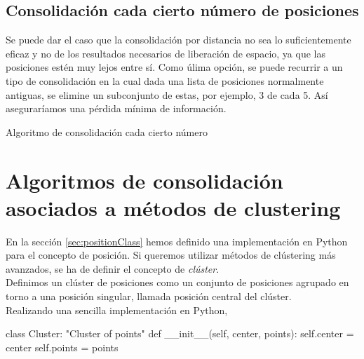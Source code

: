 \documentclass[a4paper, 12pt]{article}
\begin{document}
\subsection{Consolidaci\'on cada cierto n\'umero de posiciones}

Se puede dar el caso que la consolidaci\'on por distancia no sea lo suficientemente eficaz y no de los resultados necesarios de liberaci\'on de espacio, ya que las posiciones est\'en muy lejos entre s\'i. Como \'ulima opci\'on, se puede recurrir a un tipo de consolidaci\'on en la cual dada una lista de posiciones normalmente antiguas, se elimine un subconjunto de estas, por ejemplo, 3 de cada 5. As\'i asegurar\'iamos una p\'erdida m\'inima de informaci\'on. \\

\begin{algorithm}[h]\label{consolidationByEachSomeNumber}
\begin{algorithmic}[1]
			\EndFor
		\EndIf
	\EndFor
\EndFunction
\end{algorithmic}
\caption{\label{alg:consolidationByEach} Algoritmo de consolidaci\'on cada cierto n\'umero}
\end{algorithm}


\pagebreak
\section{Algoritmos de consolidaci\'on asociados a m\'etodos de clustering}



En la secci\'on \ref{sec:positionClass} hemos definido una implementaci\'on en Python para el concepto de posici\'on. Si queremos utilizar m\'etodos de cl\'ustering m\'as avanzados, se ha de definir el concepto de \textit{cl\'uster}. \\

Definimos un cl\'uster de posiciones como un conjunto de posiciones agrupado en torno a una posici\'on singular, llamada posici\'on central del cl\'uster.\\

Realizando una sencilla implementaci\'on en Python,


\begin{python}
class Cluster:
	"Cluster of points"
	def __init__(self, center, points):
    	self.center = center
		self.points = points
\end{python}
\end{document}
